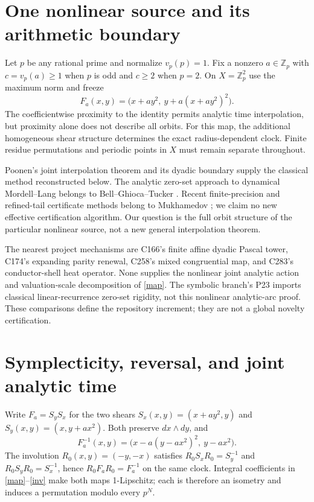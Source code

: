 \documentclass[10pt]{article}
\newcommand{\Zp}{\mathbb Z_p}
\begin{document}
\section{One nonlinear source and its arithmetic boundary}
Let $p$ be any rational prime and normalize $v_p(p)=1$.
Fix a nonzero $a\in\Zp$ with $c=v_p(a)\ge1$ when $p$ is odd
and $c\ge2$ when $p=2$. On $X=\Zp^2$ use the maximum norm and freeze
\begin{equation}\label{map}
 F_a(x,y)=\bigl(x+ay^2,\ y+a(x+ay^2)^2\bigr).
\end{equation}
The coefficientwise proximity to the identity permits analytic time
interpolation, but proximity alone does not describe all orbits. For this
map, the additional homogeneous shear structure determines the exact
radius-dependent clock. Finite residue permutations and periodic points
in $X$ must remain separate throughout.

Poonen's joint interpolation theorem and its dyadic boundary
\cite{poonen} supply the classical method reconstructed below.
The analytic zero-set approach to dynamical Mordell--Lang belongs to
Bell--Ghioca--Tucker \cite{bgt}. Recent finite-precision and refined-tail
certificate methods belong to Mukhamedov \cite{mukhamedov}; we claim no
new effective certification algorithm. Our question is the full orbit
structure of the particular nonlinear source, not a new general
interpolation theorem.

The nearest project mechanisms are C166's finite affine dyadic Pascal
tower, C174's expanding parity renewal, C258's mixed congruential map,
and C283's conductor-shell heat operator. None supplies the nonlinear
joint analytic action and valuation-scale decomposition of \eqref{map}.
The symbolic branch's P23 imports classical linear-recurrence zero-set
rigidity, not this nonlinear analytic-arc proof. These comparisons define
the repository increment; they are not a global novelty certification.

\section{Symplecticity, reversal, and joint analytic time}
Write $F_a=S_yS_x$ for the two shears
$S_x(x,y)=(x+ay^2,y)$ and $S_y(x,y)=(x,y+ax^2)$.
Both preserve $dx\wedge dy$, and
\begin{equation}\label{inv}
 F_a^{-1}(x,y)=\bigl(x-a(y-ax^2)^2,\ y-ax^2\bigr).
\end{equation}
The involution $R_0(x,y)=(-y,-x)$ satisfies
$R_0S_xR_0=S_y^{-1}$ and $R_0S_yR_0=S_x^{-1}$, hence
$R_0F_aR_0=F_a^{-1}$ on the same clock. Integral coefficients in
\eqref{map}--\eqref{inv} make both maps 1-Lipschitz; each is therefore
an isometry and induces a permutation modulo every $p^N$.
\end{document}
